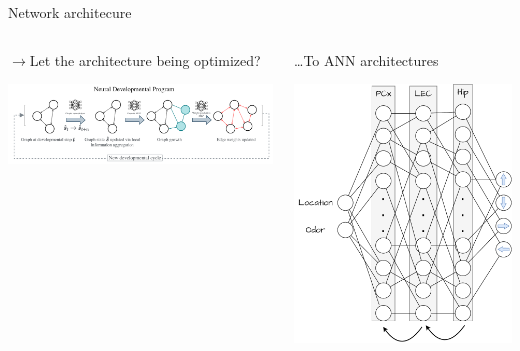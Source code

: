 \documentclass[bigger]{beamer}
\begin{document}
\begin{frame}[label={sec:orgeef6298}]{Network architecure}
\begin{columns}
\begin{column}{0.5\columnwidth}
\begin{center}
    $\rightarrow$Let the architecture being optimized?
\end{center}
\begin{center}
\includegraphics[width=\textwidth]{img/neural-dev-program.png}
\end{center}
\end{column}
\begin{column}{0.5\columnwidth}
\begin{center}
    \dots{}To ANN architectures
\end{center}
\begin{center}
\includegraphics[height=0.4\textheight]{img/nn-architecture-fully-connected.drawio.pdf}

\end{center}
\end{column}
\end{columns}
\end{frame}
\end{document}
